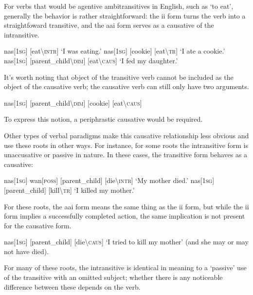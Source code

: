 For verbs that would be agentive ambitransitives in English, such as `to eat', generally the behavior is rather straightforward: the {\rootpart}ii{\rootpart} form turns the verb into a straightfoward transitive, and the aa{\rootpart}i{\rootpart} form serves as a causative of the intransitive. 

\pex
\a
\begingl
nas[\textsc{1sg}]
[eat\textbackslash\textsc{intr}]
\glft `I was eating.'
\endgl
\a
\begingl
nas[\textsc{1sg}]
[cookie]
[eat\textbackslash\textsc{tr}]
\glft `I ate a cookie.'
\endgl
\a
\begingl
nas[\textsc{1sg}]
[parent\_child\textbackslash\textsc{dim}]
[eat\textbackslash\textsc{caus}]
\glft `I fed my daughter.'
\endgl
\xe

It's worth noting that object of the transitive verb cannot be included as the object of the causative verb; the causative verb can still only have two arguments.

\ex
\ljudge{*}
\begingl
nas[\textsc{1sg}]
[parent\_child\textbackslash\textsc{dim}]
[cookie]
[eat\textbackslash\textsc{caus}]
\endgl
\xe

\noindent To express this notion, a periphrastic causative would be required.

Other types of verbal paradigms make this causative relationship less obvious and use these roots in other ways. For instance, for some roots the intransitive form is unaccusative or passive in nature. In these cases, the transitive form behaves as a causative:

\pex
\a
\begingl
nas[\textsc{1sg}]
wan[\textsc{poss}]
[parent\_child]
[die\textbackslash\textsc{intr}]
\glft `My mother died.'
\endgl
\a
\begingl
nas[\textsc{1sg}]
[parent\_child]
[kill\textbackslash\textsc{tr}]
\glft `I killed my mother.'
\endgl
\xe

For these roots, the aa{\rootpart}i{\rootpart} form means the same thing as the {\rootpart}ii{\rootpart} form, but while the {\rootpart}ii{\rootpart} form implies a successfully completed action, the same implication is not present for the causative form.

\ex
\begingl
nas[\textsc{1sg}]
[parent\_child]
[die\textbackslash\textsc{caus}]
\glft `I tried to kill my mother' (and she may or may not have died).
\endgl
\xe

\noindent For many of these roots, the intransitive is identical in meaning to a `passive' use of the transitive with an omitted subject; whether there is any noticeable difference between these depends on the verb.


